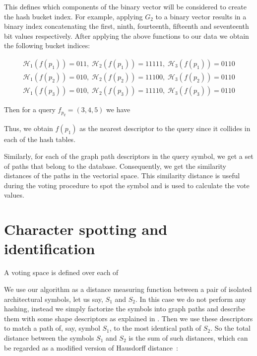 This defines which components of the binary vector will be considered to create the hash bucket index. For example, applying $G_2$ to a binary vector results in a binary index concatenating the first, ninth, fourteenth, fifteenth and seventeenth bit values respectively. After applying the above functions to our data we obtain the following bucket indices:

\begin{eqnarray*}
\mathcal{H}_1(f(p_1))=011,\;\mathcal{H}_2(f(p_1))=11111,\;\mathcal{H}_3(f(p_1))=0110 \\
\mathcal{H}_1(f(p_2))=010,\;\mathcal{H}_2(f(p_2))=11100,\;\mathcal{H}_3(f(p_2))=0110 \\
\mathcal{H}_1(f(p_3))=010,\;\mathcal{H}_2(f(p_3))=11110,\;\mathcal{H}_3(f(p_3))=0110 
\end{eqnarray*}

Then for a query $f_{p_q}=(3,4,5)$ we have


Thus, we obtain $f(p_1)$ as the nearest descriptor to the query since it collides in each of the hash tables.

Similarly, for each of the graph path descriptors in the query symbol, we get a set of paths that belong to the database. Consequently, we get the similarity distances of the paths in the vectorial space. This similarity distance is useful during the voting procedure to spot the symbol and is used to calculate the vote values.

\section{Character spotting and identification}
\label{ssec:hssg:vot}
A voting space is defined over each of 

We use our algorithm as a distance measuring function between a pair of isolated architectural symbols, let us say, $S_1$ and $S_2$. In this case we do not perform any hashing, instead we simply factorize the symbols into graph paths and describe them with some shape descriptors as explained in . Then we use these descriptors to match a path of, say, symbol $S_1$, to the most identical path of $S_2$. So the total distance between the symbols $S_1$ and $S_2$ is the sum of such distances, which can be regarded as a modified version of Hausdorff distance~\cite{Fischer2013}:

